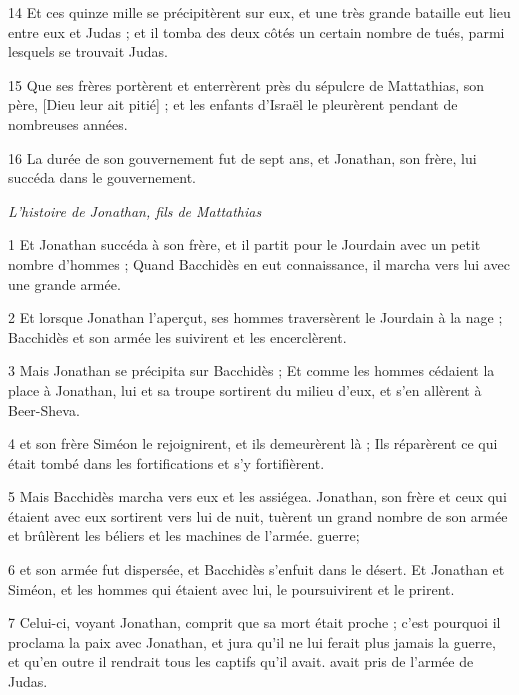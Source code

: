 \par 14 Et ces quinze mille se précipitèrent sur eux, et une très grande bataille eut lieu entre eux et Judas ; et il tomba des deux côtés un certain nombre de tués, parmi lesquels se trouvait Judas.

\par 15 Que ses frères portèrent et enterrèrent près du sépulcre de Mattathias, son père, [Dieu leur ait pitié] ; et les enfants d'Israël le pleurèrent pendant de nombreuses années.

\par 16 La durée de son gouvernement fut de sept ans, et Jonathan, son frère, lui succéda dans le gouvernement.


\par \textit{L'histoire de Jonathan, fils de Mattathias}

\par 1 Et Jonathan succéda à son frère, et il partit pour le Jourdain avec un petit nombre d'hommes ; Quand Bacchidès en eut connaissance, il marcha vers lui avec une grande armée.

\par 2 Et lorsque Jonathan l'aperçut, ses hommes traversèrent le Jourdain à la nage ; Bacchidès et son armée les suivirent et les encerclèrent.

\par 3 Mais Jonathan se précipita sur Bacchidès ; Et comme les hommes cédaient la place à Jonathan, lui et sa troupe sortirent du milieu d'eux, et s'en allèrent à Beer-Sheva.

\par 4 et son frère Siméon le rejoignirent, et ils demeurèrent là ; Ils réparèrent ce qui était tombé dans les fortifications et s'y fortifièrent.

\par 5 Mais Bacchidès marcha vers eux et les assiégea. Jonathan, son frère et ceux qui étaient avec eux sortirent vers lui de nuit, tuèrent un grand nombre de son armée et brûlèrent les béliers et les machines de l'armée. guerre;

\par 6 et son armée fut dispersée, et Bacchidès s'enfuit dans le désert. Et Jonathan et Siméon, et les hommes qui étaient avec lui, le poursuivirent et le prirent.

\par 7 Celui-ci, voyant Jonathan, comprit que sa mort était proche ; c'est pourquoi il proclama la paix avec Jonathan, et jura qu'il ne lui ferait plus jamais la guerre, et qu'en outre il rendrait tous les captifs qu'il avait. avait pris de l'armée de Judas.

